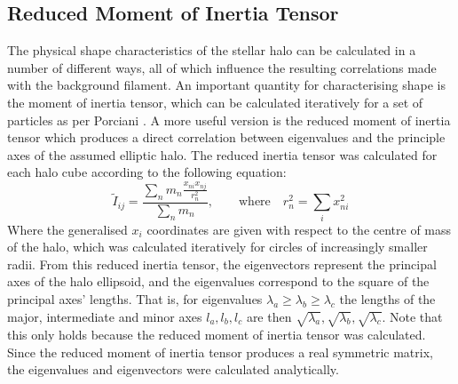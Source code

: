 \documentclass[journal]{IEEEtran}
\begin{document}
\subsection{Reduced Moment of Inertia Tensor}
The physical shape characteristics of the stellar halo can be calculated in a number of different ways, all of which influence the resulting correlations made with the background filament. An important quantity for characterising shape is the moment of inertia tensor, which can be calculated iteratively for a set of particles as per Porciani \cite{porciani02a}. A more useful version is the reduced moment of inertia tensor \cite{tenneti15} which produces a direct correlation between eigenvalues and the principle axes of the assumed elliptic halo. The reduced inertia tensor was calculated for each halo cube according to the following equation:
\begin{equation}
	\tilde{I}_{ij}=\frac{\sum_n m_n \frac{x_{ni}x_{nj}}{r^2_n}}{\sum_n m_n}, \quad \quad \text{where} \quad r^2_n=\sum_i x^2_{ni}
	\label{eq:moitensor}
\end{equation}
Where the generalised $x_i$ coordinates are given with respect to the centre of mass of the halo, which was calculated iteratively for circles of increasingly smaller radii. From this reduced inertia tensor, the eigenvectors represent the principal axes of the halo ellipsoid, and the eigenvalues correspond to the square of the principal axes' lengths. That is, for eigenvalues $\lambda_{a} \geq \lambda_{b} \geq \lambda_{c} $ the lengths of the major, intermediate and minor axes $l_{a},l_{b},l_{c}$ are then $\sqrt{\lambda_{a}}, \sqrt{\lambda_{b}}, \sqrt{\lambda_{c}}$. Note that this only holds because the reduced moment of inertia tensor was calculated.
Since the reduced moment of inertia tensor produces a real symmetric matrix, the eigenvalues and eigenvectors were calculated analytically. 
\end{document}
